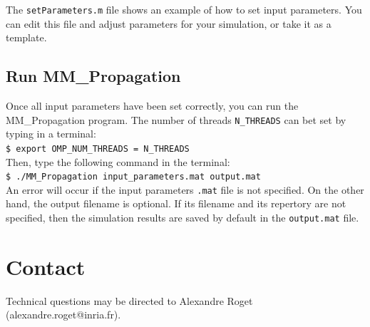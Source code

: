 \documentclass[11pt]{amsart}
\newcommand{\name}{{\rm MM\_Propagation }}
\begin{document}
The {\tt setParameters.m} file shows an example of how to set input parameters.
You can edit this file and adjust parameters for your simulation, or take it as a template.

\subsection{Run MM\_Propagation}
\label{subsec:howtorun}

Once all input parameters have been set correctly, you can run the \name program. The number of threads \texttt{N\_THREADS} can bet set by typing in a terminal: \\

{\tt \$ export OMP\_NUM\_THREADS = N\_THREADS} \\

Then, type the following command in the terminal: \\

{\tt \$ ./MM\_Propagation input\_parameters.mat output.mat} \\

An error will occur if the input parameters {\tt .mat} file is not specified.
On the other hand, the output filename is optional.
If its filename and its repertory are not specified,
then the simulation results are saved by default in the {\tt output.mat} file.

\section*{Contact}

Technical questions may be directed to Alexandre Roget (alexandre.roget@inria.fr).
\end{document}
